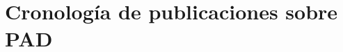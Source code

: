 




















\chapter{Cronología de publicaciones sobre PAD}\label{apendix:ApendiceCronologiaPAD}

